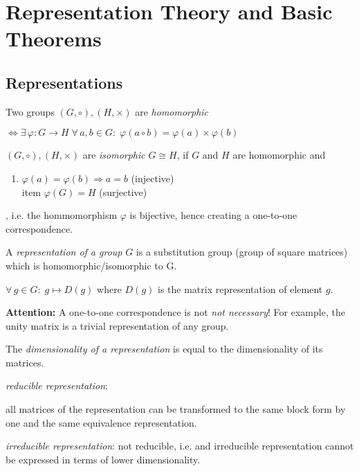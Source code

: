 \newpage
\section{Representation Theory and Basic Theorems}
\subsection{Representations}

\begin{dfn}\label{dfn:21_homo-iso}
Two groups $(G, \circ), (H, \times)$ are \textit{homomorphic} \par
$\Leftrightarrow \exists \, \varphi: G \rightarrow H \; \forall \, a,b \in G: \; \varphi(a\circ b) = \varphi(a) \times \varphi(b)$ \par 
\noindent  $(G, \circ), (H, \times)$ are \textit{isomorphic} $G \cong H$, if $G$ and $H$ are homomorphic and
\begin{enumerate}
	\item $\varphi(a) = \varphi(b) \Rightarrow a=b$ (injective)
	\\item $\varphi(G) = H$ (surjective)
\end{enumerate}
\noindent, i.e. the hommomorphism $\varphi$ is bijective, hence creating a one-to-one correspondence. 
\end{dfn}

\begin{dfn}\label{dfn:22_repr-group}
A \textit{representation of a group} $G$ is a substitution group (group of square matrices) which is homomorphic/isomorphic to G. \par
$\forall \, g \in G: \; g \mapsto D(g)$ where $D(g)$ is the matrix representation of element $g$. 
\end{dfn}

\textbf{Attention:} A one-to-one correspondence is not \textit{not necessary}! For example, the unity matrix is a trivial representation of any group. 

\begin{dfn}\label{dfn:23_dim-repr}
The \textit{dimensionality of a representation} is equal to the dimensionality of its matrices. 
\end{dfn}

\begin{dfn}\label{dfn:23_irred-repr}
\noindent \textit{reducible representation}: \par
all matrices of the representation can be transformed to the same block form by one and the same equivalence representation. \par 
\noindent \textit{irreducible representation}:
not reducible, i.e. and irreducible representation cannot be expressed in terms of lower dimensionality. 
\end{dfn}

